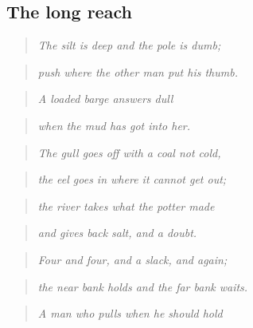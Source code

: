 \documentclass{design/chronicle}
\begin{document}
\subsection*{The long reach}

\begin{quote}\itshape The silt is deep and the pole is dumb;\end{quote}

\begin{quote}\itshape push where the other man put his thumb.\end{quote}

\begin{quote}\itshape A loaded barge answers dull\end{quote}

\begin{quote}\itshape when the mud has got into her.\end{quote}

\begin{quote}\itshape \end{quote}

\begin{quote}\itshape The gull goes off with a coal not cold,\end{quote}

\begin{quote}\itshape the eel goes in where it cannot get out;\end{quote}

\begin{quote}\itshape the river takes what the potter made\end{quote}

\begin{quote}\itshape and gives back salt, and a doubt.\end{quote}

\begin{quote}\itshape \end{quote}

\begin{quote}\itshape Four and four, and a slack, and again;\end{quote}

\begin{quote}\itshape the near bank holds and the far bank waits.\end{quote}

\begin{quote}\itshape A man who pulls when he should hold\end{quote}
\end{document}
